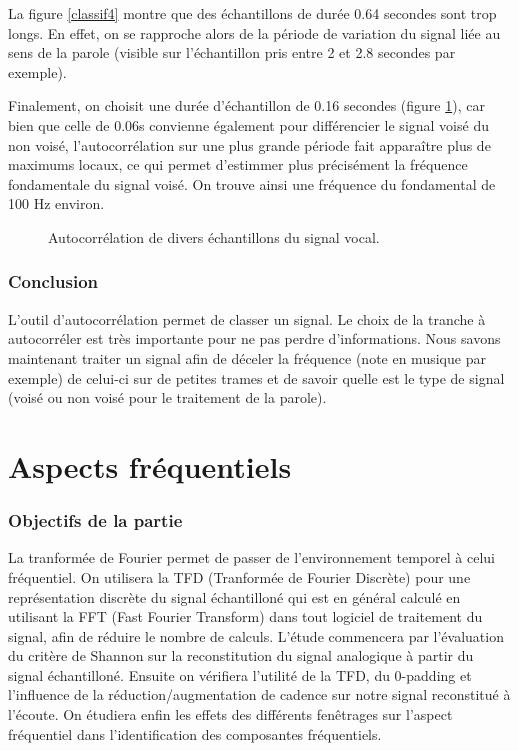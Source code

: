 \documentclass[french]{article}
\begin{document}
La figure \ref{classif4} montre que des échantillons de durée 0.64 secondes sont trop longs. En effet, on se rapproche alors de la période de variation du signal liée au sens de la parole (visible sur l'échantillon pris entre 2 et 2.8 secondes par exemple).

\FloatBarrier

Finalement,  on choisit une durée d'échantillon de 0.16 secondes (figure \ref{classif3}), car bien que celle de 0.06s convienne également pour différencier le signal voisé du non voisé, l'autocorrélation sur une plus grande période fait apparaître plus de maximums locaux, ce qui permet d'estimmer plus précisément la fréquence fondamentale du signal voisé. On trouve ainsi une fréquence du fondamental de 100 Hz environ.

\begin{figure}[h!]
	\centering
	
	\caption{Autocorrélation de divers échantillons du signal vocal.}
	\label{classif3}
\end{figure}

\section*{Conclusion}
L'outil d'autocorrélation permet de classer un signal. Le choix de la tranche à autocorréler est très importante pour ne pas perdre d'informations. Nous savons maintenant traiter un signal afin de déceler la fréquence (note en musique par exemple) de celui-ci sur de petites trames et de savoir quelle est le type de signal (voisé ou non voisé pour le traitement de la parole).

\FloatBarrier
\newpage
\clearpage
\part{Aspects fréquentiels}

\section*{Objectifs de la partie}
La tranformée de Fourier permet de passer de l'environnement temporel à celui fréquentiel. On utilisera la TFD (Tranformée de Fourier Discrète) pour une représentation discrète du signal échantilloné qui est en général calculé en utilisant la FFT (Fast Fourier Transform) dans tout logiciel de traitement du signal, afin de réduire le nombre de calculs. 
L'étude commencera par l'évaluation du critère de Shannon sur la reconstitution du signal analogique à partir du signal échantilloné. Ensuite on vérifiera l'utilité de la TFD, du 0-padding et l'influence de la réduction/augmentation de cadence sur notre signal reconstitué à l'écoute. On étudiera enfin les effets des différents fenêtrages sur l'aspect fréquentiel dans l'identification des composantes fréquentiels.
\end{document}
